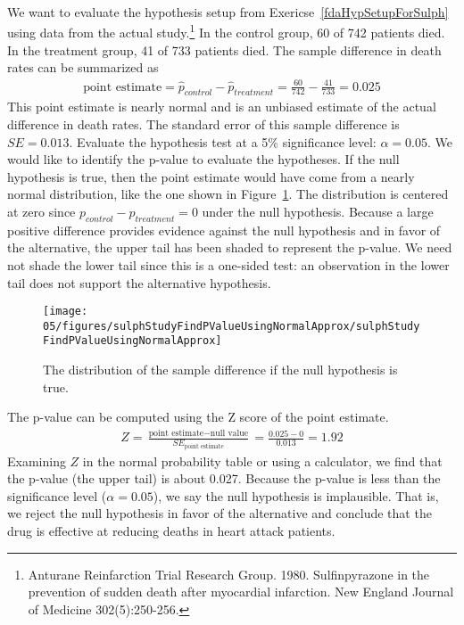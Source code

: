 \begin{example}{We want to evaluate the hypothesis setup from Exericse~\ref{fdaHypSetupForSulph} using data from the actual study.\footnote{Anturane Reinfarction Trial Research Group. 1980. Sulfinpyrazone in the prevention of sudden death after myocardial infarction. New England Journal of Medicine 302(5):250-256.} In the control group, 60 of 742 patients died. In the treatment group, 41 of 733 patients died. The sample difference in death rates can be summarized as
\begin{eqnarray*}
\text{point estimate} = \hat{p}_{control} - \hat{p}_{treatment} = \frac{60}{742} - \frac{41}{733} = 0.025
\end{eqnarray*}
This point estimate is nearly normal and is an unbiased estimate of the actual difference in death rates. The standard error of this sample difference is $SE = 0.013$. Evaluate the hypothesis test at a 5\% significance level: $\alpha=0.05$.}
We would like to identify the p-value to evaluate the hypotheses. If the null hypothesis is true, then the point estimate would have come from a nearly normal distribution, like the one shown in Figure~\ref{sulphStudyFindPValueUsingNormalApprox}. The distribution is centered at zero since $p_{control}-p_{treatment}=0$ under the null hypothesis. Because a large positive difference provides evidence against the null hypothesis and in favor of the alternative, the upper tail has been shaded to represent the p-value. We need not shade the lower tail since this is a one-sided test: an observation in the lower tail does not support the alternative hypothesis.

\begin{figure}[bt]
   \centering
   \texttt{[image: 05/figures/sulphStudyFindPValueUsingNormalApprox/sulphStudyFindPValueUsingNormalApprox]}
   \caption{The distribution of the sample difference if the null hypothesis is true.}
   \label{sulphStudyFindPValueUsingNormalApprox}
\end{figure}

The p-value can be computed using the Z score of the point estimate.
\begin{eqnarray}
Z = \frac{\text{point estimate} - \text{null value}}{SE_{\text{point estimate}}}
	= \frac{0.025 - 0}{0.013} = 1.92
\label{zScoreOfPointEstimateForSulphinpyrazoneThisIsFirstTestStatReference}
\end{eqnarray}
Examining $Z$ in the normal probability table or using a calculator, we find that the p-value (the upper tail) is about 0.027. Because the p-value is less than the significance level ($\alpha=0.05$), we say the null hypothesis is implausible. That is, we reject the null hypothesis in favor of the alternative and conclude that the drug is effective at reducing deaths in heart attack patients.
\end{example}

